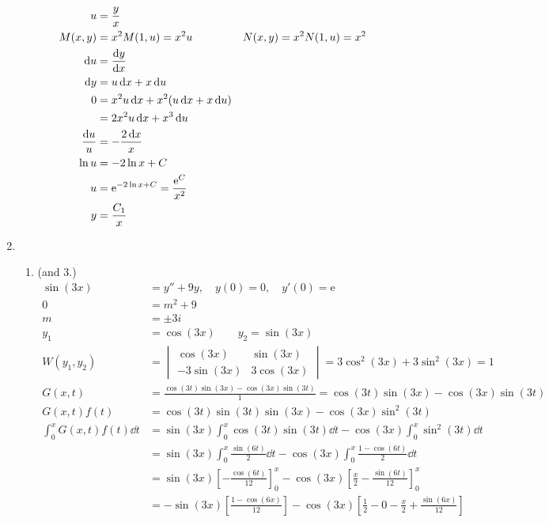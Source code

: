 \documentclass[12pt, A4]{article}
\newcommand{\en}{\text{e}}
\begin{document}
\begin{enumerate}[Q1]
\begin{enumerate}[1.]
\begin{align*}
						u &= \frac{y}{x} \\
						M(x, y) &= x^2M(1, u)
								= x^2u &
							N(x, y) &= x^2N(1, u)
								= x^2 \\
						\dd{u} &= \dv{y}{x} \\
						\dd{y} &= u\dd{x} + x\dd{u} \\
						0 &= x^2u\dd{x} + x^2(u\dd{x} + x\dd{u}) \\
							&= 2x^2u\dd{x} + x^3\dd{u} \\
						\frac{\dd{u}}{u} &= -\frac{2\dd{x}}{x} \\
						\ln u &= -2\ln x + C \\
						u &= \en^{-2\ln x + C}
							= \frac{\en^{C}}{x^2} \\
						y &= \frac{C_1}{x}
					\end{align*}
			\end{enumerate}
		\item
			\begin{enumerate}[1.]
				\item (and 3.)
					\begin{align*}
						\sin(3x) &= y'' + 9y, \quad y(0) = 0, \quad y'(0) = \en \\
						0 &= m^2 + 9 \\
						m &= \pm 3i \\
						y_1 &= \cos(3x) \qquad
								y_2 = \sin(3x) \\
						W(y_1, y_2) &= \begin{vmatrix}
								\cos(3x) & \sin(3x) \\
								-3\sin(3x) & 3\cos(3x)
							\end{vmatrix}
								= 3\cos^2(3x) + 3\sin^2(3x)
								= 1 \\
						G(x, t) &= \frac{\cos(3t)\sin(3x) - \cos(3x)\sin(3t)}{1}
							= \cos(3t)\sin(3x) - \cos(3x)\sin(3t) \\
						G(x, t)f(t) &= \cos(3t)\sin(3t)\sin(3x) - \cos(3x)\sin^2(3t) \\
						\int_0^x G(x, t)f(t) \dd{t}&= \sin(3x)\int_0^x \cos(3t)\sin(3t)\dd{t} - \cos(3x)\int_0^x \sin^2(3t) \dd{t} \\
							&= \sin(3x)\int_0^x \frac{\sin(6t)}{2} \dd{t} - \cos(3x)\int_0^x \frac{1 - \cos(6t)}{2} \dd{t} \\
							&= \sin(3x)\left[-\frac{\cos(6t)}{12}\right]_0^x - \cos(3x)\left[\frac{x}{2} - \frac{\sin(6t)}{12}\right]_0^x \\
							&= -\sin(3x)\left[\frac{1 - \cos(6x)}{12}\right] - \cos(3x)\left[\frac{1}{2} - 0 - \frac{x}{2} + \frac{\sin(6x)}{12}\right] \\

\end{align*}
\end{enumerate}
\end{enumerate}
\end{document}

